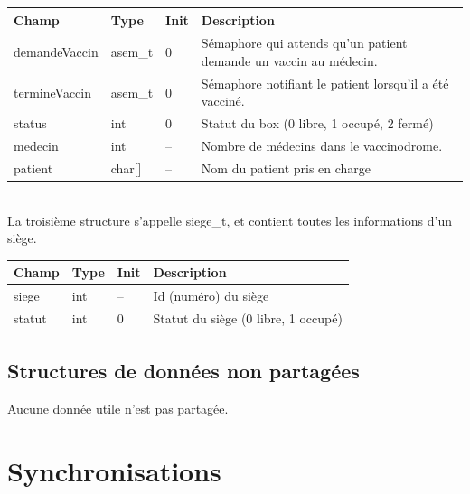 \documentclass[a4paper]{article}
\makeatletter
\newenvironment{expl}{%
  \begin{list}{}{%
    \small\itshape%
    \topsep\z@%
    \listparindent0pt%
    \parsep0.75\baselineskip%
    \setlength{\leftmargin}{20mm}%
    \setlength{\rightmargin}{20mm}%
  }
    \item[]}%
    {\end{list}}
\makeatother
\begin{document}
  \begin{tabularx}{\linewidth}{|l|l|l|X|}
    \hline
    Champ & Type & Init & Description \\ \hline%
    demandeVaccin & asem\_t & 0 & Sémaphore qui attends qu'un patient demande un vaccin au médecin. \\ \hline%
    termineVaccin & asem\_t & 0 & Sémaphore notifiant le patient lorsqu'il a été vacciné. \\ \hline%
    status & int & 0 & Statut du box (0 libre, 1 occupé, 2 fermé) \\ \hline%
    medecin & int & -- & Nombre de médecins dans le vaccinodrome. \\ \hline%
    patient & char[] & -- & Nom du patient pris en charge \\ \hline%

  \end{tabularx}
  \\[12pt]
  La troisième structure s'appelle siege\_t, et contient toutes les informations d'un siège.

  \begin{tabularx}{\linewidth}{|l|l|l|X|}
    \hline
    Champ & Type & Init & Description \\ \hline%
    siege & int & -- & Id (numéro) du siège \\ \hline%
    statut & int & 0 & Statut du siège (0 libre, 1 occupé) \\ \hline%

  \end{tabularx}

  \subsection{Structures de données non partagées}

  \begin{expl}
    Aucune donnée utile n'est pas partagée.
  \end{expl}

  \newpage

  \section{Synchronisations}
\end{document}
